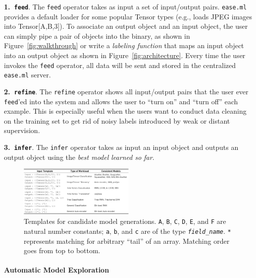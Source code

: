 \documentclass[letterpaper]{vldb}
\newcommand{\eml}{\texttt{ease.ml}\xspace}
\begin{document}
\noindent
{\textbf{1.~\texttt{feed}}.} The \texttt{feed} operator takes
as input a set of input/output pairs. \eml provides
a default loader for some popular Tensor types (e.g., loads
JPEG images into Tensor[A,B,3]). To associate an output
object and an input object, the user can simply pipe a pair of
objects into the binary, as shown in Figure~\ref{fig:walkthrough} or
write a {\em labeling function} that maps an input
object into an output object as shown in Figure~\ref{fig:architecture}.
Every time the user invokes the \texttt{feed} operator,
all data will be sent and stored in the centralized
\eml server.

\noindent
{\textbf{2.~\texttt{refine}}.} The \texttt{refine} operator
shows all input/output pairs that the user ever \texttt{feed}'ed
into the system and allows the user to ``turn on''
and ``turn off'' each example. This is especially useful when
the users want to conduct data cleaning on the training set
to get rid of noisy labels introduced by weak or distant supervision.

\noindent
{\textbf{3.~\texttt{infer}}.} The \texttt{infer} operator
takes as input an input object and outputs an output object
using the {\em best model learned so far}.


\begin{figure}[t]
\centering
\includegraphics[width=0.5\textwidth]{figures/models}
\vspace{-2em}
\caption{Templates for candidate model generations. \texttt{A},
\texttt{B}, \texttt{C}, \texttt{D}, \texttt{E}, and \texttt{F}
are natural number constants; \texttt{a}, \texttt{b}, and \texttt{c} are of the type \texttt{\em field\_name}. \texttt{*} represents
matching for arbitrary ``tail'' of an array. Matching order
goes from top to bottom.}
\label{fig:templates}
\end{figure}

\paragraph*{Automatic Model Exploration}
\end{document}
